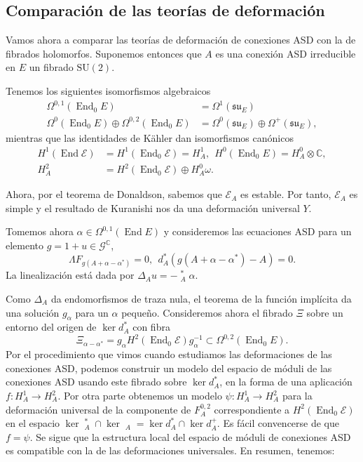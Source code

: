 \documentclass[12pt, a4paper]{amsart}
\newcommand\CC{\mathbb{C}}
\newcommand\GG{\mathcal{G}}
\newcommand\su{\mathfrak{su}}
\newcommand\EE{\mathscr{E}}
\DeclareMathOperator\End{End}
\DeclareMathOperator\delbar{\bar{\partial}}
\theoremstyle{remark} \newtheorem{rmk}[thm]{Observación}
\theoremstyle{remark} \newtheorem{rmks}[thm]{Observaciones}
\theoremstyle{definition} \newtheorem{defn}[thm]{Definición}
\theoremstyle{definition} \newtheorem{ejs}[thm]{Ejemplos}
\theoremstyle{definition} \newtheorem{ej}[thm]{Ejemplo}
\begin{document}
\subsection{Comparación de las teorías de deformación}
Vamos ahora a comparar las teorías de deformación de conexiones ASD con la de fibrados holomorfos. Suponemos entonces que $A$ es una conexión ASD irreducible en $E$ un fibrado $\mathrm{SU}(2)$.

Tenemos los siguientes isomorfismos algebraicos
\begin{align*}
	\Omega^{0,1}(\End_0 E) &= \Omega^1(\su_E) \\
	\Omega^0(\End_0 E) \oplus \Omega^{0,2}(\End_0 E) &= \Omega^0(\su_E) \oplus \Omega^+(\su_E),
\end{align*}
mientras que las identidades de Kähler dan isomorfismos canónicos
\begin{align*}
	H^1(\End \EE) &= H^1(\End_0 \EE)=H^1_A, \ \ H^0(\End_0 E)=H^0_A \otimes \CC, \\
	H^2_A &= H^2(\End_0 \EE) \oplus H^0_A \omega.
\end{align*}

Ahora, por el teorema de Donaldson, sabemos que $\EE_A$ es estable. Por tanto, $\EE_A$ es simple y el resultado de Kuranishi nos da una deformación universal $Y$.

Tomemos ahora $\alpha\in \Omega^{0,1}(\End E)$ y consideremos las ecuaciones ASD para un elemento $g=1+u\in \GG^\CC$,
\begin{equation*}
	\Lambda F_{g(A+\alpha -\alpha^*)}=0, \ \ d_A^*(g(A+\alpha-\alpha^*)-A)=0. 
\end{equation*} 
La linealización está dada por $\Delta_A u =-\delbar^*_A \alpha$.

Como $\Delta_A$ da endomorfismos de traza nula, el teorema de la función implícita da una solución $g_\alpha$ para un $\alpha$ pequeño. Consideremos ahora el fibrado $\Xi$ sobre un entorno del origen de $\ker d_A^*$ con fibra
\begin{equation*}
	\Xi_{\alpha-\alpha^*}=g_\alpha H^2(\End_0 \EE) g_{\alpha}^{-1} \subset \Omega^{0,2}(\End_0 E). 
\end{equation*} 
Por el procedimiento que vimos cuando estudiamos las deformaciones de las conexiones ASD, podemos construir un modelo del espacio de móduli de las conexiones ASD usando este fibrado sobre $\ker d_A^*$, en la forma de una aplicación $f:H^1_A\rightarrow H^2_A$. Por otra parte obtenemos un modelo $\psi:H^1_A \rightarrow H^2_A$ para la deformación universal de la componente  de $F_A^{0,2}$ correspondiente a $H^{2}(\End_0 \EE)$ en el espacio $\ker \delbar^*_A \cap \ker \delbar_A = \ker d_A^* \cap \ker d_A^+$. Es fácil convencerse de que  $f=\psi$. Se sigue que la estructura local del espacio de móduli de conexiones ASD es compatible con la de las deformaciones universales. En resumen, tenemos:
\end{document}
